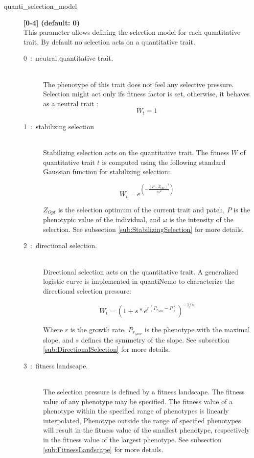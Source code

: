 \documentclass[letterpaper,12pt,oneside]{book}
\begin{document}
\begin{description}
\item[quanti\_selection\_model]\textbf{[0-4] (default: 0)}\\
This parameter allows defining the selection model for each quantitative trait. By default no selection acts on a quantitative trait. 
\begin{description}

\item [0~:~neutral quantitative trait.] \textbf{}\\
The phenotype of this trait does not feel any selective pressure. Selection might act only ifs fitness factor is set, otherwise, it behaves as a neutral trait :
\[ W_{t} = 1\]
 
\item [1~:~stabilizing selection] \textbf{}\\
Stabilizing selection acts on the quantitative trait. The fitness $W$ of quantitative trait $t$ is
computed using the following standard Gaussian function for stabilizing selection:

\[W_{t} = e^{\left(-\frac{\left(P-Z_{Opt}\right)^2}{2\omega^{2}}\right)} \]

$Z_{Opt}$ is the selection optimum of the current trait and patch, $P$ is the phenotypic value of the individual, and $\omega$ is the intensity of the selection. See subsection \ref{sub:StabilizingSelection} for more details.  

\item [2~:~directional selection.] \textbf{}\\
Directional selection acts on the quantitative trait. A generalized logistic curve \citep{Richards_1959} is implemented in quantiNemo to characterize the directional selection pressure:

    \[ W_{t} = \left(1+s*e^{r(P_{r_{Max}}-P)}\right)^{-1/s}\]

Where $r$ is the growth rate, $P_{r_{Max}}$ is the phenotype with the maximal slope, and $s$ defines the symmetry of the slope. See subsection \ref{sub:DirectionalSelection} for more details.  

\item [3~:~fitness landscape.] \textbf{}\\
The selection pressure is defined by a fitness landscape. The fitness value of any phenotype may be specified. The fitness value of a phenotype within the specified range of phenotypes is linearly interpolated, Phenotype outside the range of specified phenotypes will result in the fitness value of the smallest phenotype, respectively in the fitness value of the largest phenotype. See subsection \ref{sub:FitnessLandscape} for more details.  
 

\end{description}
\end{description}
\end{document}

